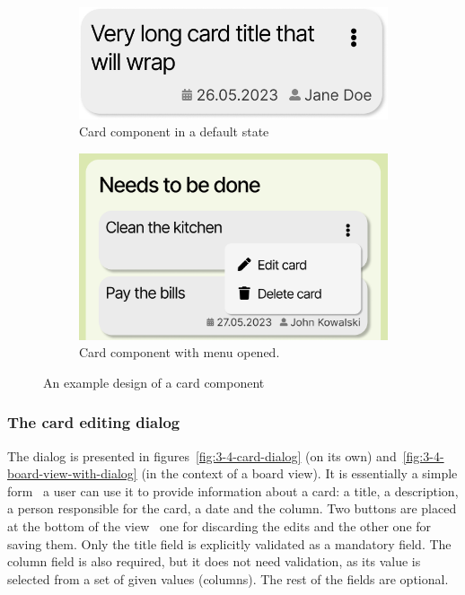 \begin{figure}
    \centering
    \begin{subfigure}[m]{0.45\textwidth}
        \centering
        \includegraphics[width=\textwidth]{./3-research-methodology/card-component}
        \caption{Card component in a default state}
        \label{fig:3-4-card-component-plain}
    \end{subfigure}
    \hfill
    \begin{subfigure}[m]{0.45\textwidth}
        \centering
        \includegraphics[width=\textwidth]{./3-research-methodology/card-component-with-menu}
        \caption{Card component with menu opened.}
        \label{fig:3-4-card-component-with-menu}
    \end{subfigure}
    \caption{An example design of a card component}
    \label{fig:3-4-card-component}
\end{figure}

\subsubsection{The card editing dialog}
The dialog is presented in figures~\ref{fig:3-4-card-dialog} (on its own) and~\ref{fig:3-4-board-view-with-dialog} (in the context of a board view).
It is essentially a simple form \textendash\ a user can use it to provide information about a card: a title, a description, a person responsible for the card, a date and the column.
Two buttons are placed at the bottom of the view \textendash\ one for discarding the edits and the other one for saving them.
Only the title field is explicitly validated as a mandatory field.
The column field is also required, but it does not need validation, as its value is selected from a set of given values (columns).
The rest of the fields are optional.

